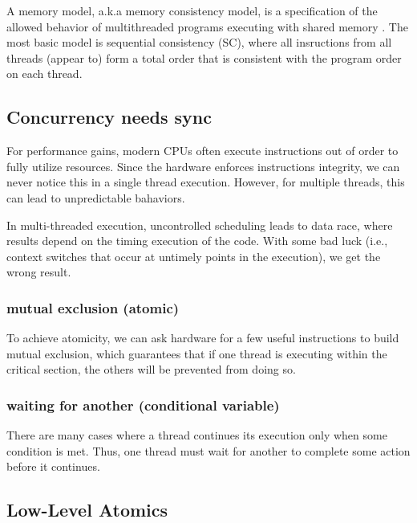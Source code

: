 A memory model, a.k.a memory consistency model, is a 
specification of the allowed behavior of multithreaded 
programs executing with shared memory . 
The most basic model is sequential consistency (SC), 
where all insructions from all threads (appear to) form a
 total order that is consistent with the program order on 
 each thread.



\subsection{Concurrency needs sync }

For performance gains, modern CPUs often execute 
instructions out of order to fully utilize resources.
 Since the hardware enforces instructions integrity,
  we can never notice this in a single thread execution. 
  However, for multiple threads, this can lead to 
  unpredictable bahaviors.

In multi-threaded execution, uncontrolled scheduling leads 
to data race, where results depend on the timing execution 
of the code. With some bad luck (i.e., context switches 
that occur at untimely points in the execution), we get 
the wrong result.

\subsubsection{mutual exclusion (atomic)}
To achieve atomicity, we can ask hardware for a few useful instructions to build mutual exclusion, which guarantees that if one thread is executing within the critical section, the others will be prevented from doing so.

\subsubsection{ waiting for another (conditional variable)}
There are many cases where a thread continues its execution 
only when some condition is met. Thus, one thread must wait
 for another to complete some action before it continues. 

\subsection{Low-Level Atomics}


